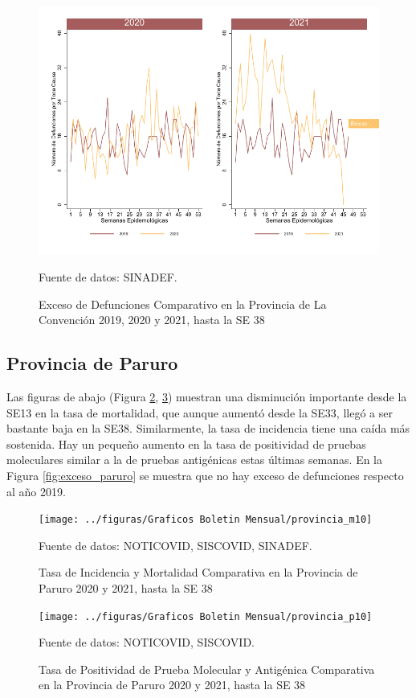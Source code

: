 \documentclass[12pt,a4paper,openany]{book}
\begin{document}
	\begin{figure}[h]
	\caption{Exceso de Defunciones Comparativo en la Provincia de La Convención 2019, 2020 y 2021, hasta la SE 38}\label{fig:exceso_laconv}
	\begin{center}
		\includegraphics[width=0.7\linewidth]{../figuras/exceso_9}
	\end{center}
	{\footnotesize {Fuente de datos: SINADEF.}}
	\end{figure}

\clearpage

	\subsection*{Provincia de Paruro}
	\noindent Las figuras de abajo (Figura \ref{fig:inc_mort_paruro}, \ref{fig:positividad_paruro})  muestran una disminución importante desde la SE13 en la tasa de mortalidad, que aunque aumentó desde la SE33, llegó a ser bastante baja en la SE38. Similarmente, la tasa de incidencia tiene una caída más sostenida. Hay un pequeño aumento en la tasa de positividad de pruebas moleculares similar a la de pruebas antigénicas estas últimas semanas. En la Figura \ref{fig:exceso_paruro} se muestra que no hay exceso de defunciones respecto al año 2019.

	\begin{figure}[h]
	\caption{Tasa de Incidencia y Mortalidad Comparativa en la Provincia de Paruro 2020 y 2021, hasta la SE 38}\label{fig:inc_mort_paruro}
	\begin{center}
		\texttt{[image: ../figuras/Graficos Boletin Mensual/provincia\_m10]}
	\end{center}
	{\footnotesize {Fuente de datos: NOTICOVID, SISCOVID, SINADEF.}}
	\end{figure}

	\begin{figure}[h]
	\caption{Tasa de Positividad de Prueba Molecular y Antigénica Comparativa en la Provincia de Paruro 2020 y 2021, hasta la SE 38}\label{fig:positividad_paruro}
	\begin{center}
		\texttt{[image: ../figuras/Graficos Boletin Mensual/provincia\_p10]}
	\end{center}
	{\footnotesize {Fuente de datos: NOTICOVID, SISCOVID.}}
	\end{figure}
\end{document}
